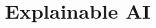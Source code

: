 \documentclass[xcolor=dvipsnames,compress,t,pdf,notes,9pt]{beamer}
\title[\insertframenumber /\inserttotalframenumber]{Explainable AI}
\begin{document}
	\begin{frame}
	\titlepage
	\end{frame}

	
	
\end{document}
